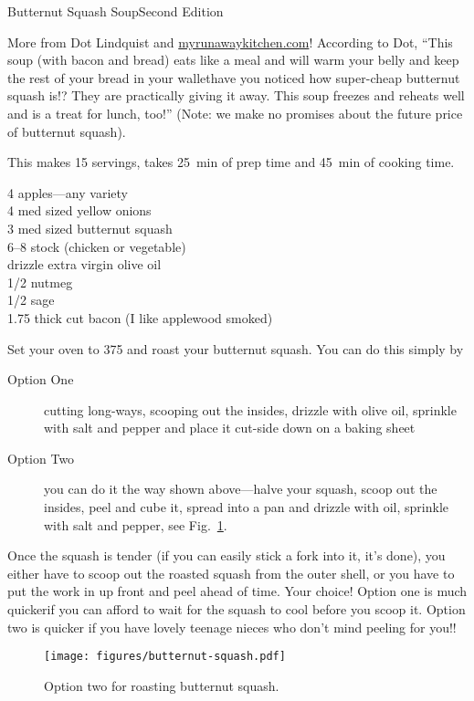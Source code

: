 \begin{entry}{Butternut Squash Soup}{Second Edition}

\begin{open}
  More from Dot Lindquist and \url{myrunawaykitchen.com}! According to Dot,
  ``This soup (with bacon and bread) eats like a meal and will warm your belly
  and keep the rest of your bread in your wallet\textellipsis have you noticed
  how super-cheap butternut squash is!?  They are practically giving it away.
  This soup freezes and reheats well and is a treat for lunch, too!'' (Note:
  we make no promises about the future price of butternut squash).

  This makes 15 servings, takes \SI{25}{\minute} of prep time and
  \SI{45}{\minute} of cooking time.
\end{open}
\begin{ingredients}
    4  apples---any variety\\
    4  med sized yellow onions\\
    3  med sized butternut squash\\
    \SIrange{6}{8}{\cup} stock (chicken or vegetable)\\
    drizzle  extra virgin olive oil\\
    \SI{1/2}{\teaspoon}  nutmeg\\
    \SI{1/2}{\teaspoon}  sage\\
    \SI{1.75}{\pound} thick cut bacon (I like applewood smoked)
\end{ingredients}
Set your oven to \SI{375}{\degreeF} and roast your butternut squash. You can
do this simply by
\begin{description}
    \item[Option One] cutting long-ways, scooping out the insides, drizzle with
    olive oil, sprinkle with salt and pepper and place it cut-side down on a
    baking sheet
    \item[Option Two] you can do it the way shown above---halve
    your squash, scoop out the insides, peel and cube it, spread into a pan and
    drizzle with oil, sprinkle with salt and pepper, see Fig.~\ref{fig:butternut-squash-two}.
\end{description}
Once the squash is tender (if you can easily stick a fork into it, it's done),
you either have to scoop out the roasted squash from the outer shell, or you
have to put the work in up front and peel ahead of time. Your choice! Option
one is much quicker\textellipsis if you can afford to wait for the squash to
cool before you scoop it. Option two is quicker if you have lovely teenage
nieces who don't mind peeling for you!!
\begin{figure}
    \centering
    \texttt{[image: figures/butternut-squash.pdf]}
    \caption{Option two for roasting butternut squash.}
    \label{fig:butternut-squash-two}
\end{figure}


\end{entry}

